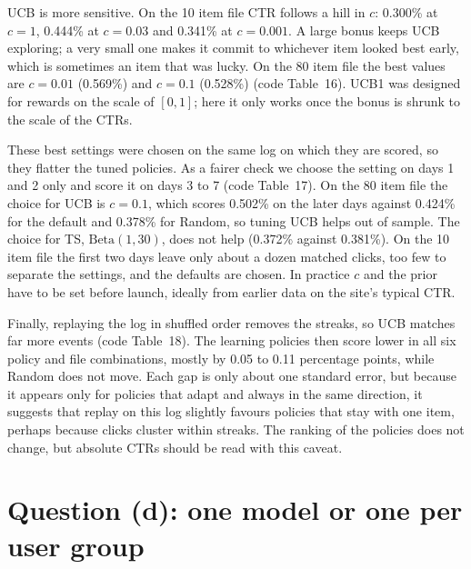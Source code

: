 \documentclass[11pt]{article}
\begin{document}
UCB is more sensitive. On the 10 item file CTR follows a hill in $c$: 0.300\%
at $c=1$, 0.444\% at $c=0.03$ and 0.341\% at $c=0.001$. A large bonus keeps
UCB exploring; a very small one makes it commit to whichever item looked best
early, which is sometimes an item that was lucky. On the 80 item file the best
values are $c=0.01$ (0.569\%) and $c=0.1$ (0.528\%) (code Table~16). UCB1
was designed for rewards on the scale of $[0,1]$; here it only works once the
bonus is shrunk to the scale of the CTRs.

These best settings were chosen on the same log on which they are scored, so
they flatter the tuned policies. As a fairer check we choose the setting on
days 1 and 2 only and score it on days 3 to 7 (code Table~17). On the 80 item
file the choice for UCB is $c=0.1$, which scores 0.502\% on the later days
against 0.424\% for the default and 0.378\% for Random, so tuning UCB helps out
of sample. The choice for TS, $\text{Beta}(1,30)$, does not help (0.372\%
against 0.381\%). On the 10 item file the first two days leave only about a dozen
matched clicks, too few to separate the settings, and the defaults are chosen. In
practice $c$ and the prior have to be set before launch, ideally from earlier
data on the site's typical CTR.

Finally, replaying the log in shuffled order removes the streaks, so UCB
matches far more events (code Table~18). The learning policies then score
lower in all six policy and file combinations, mostly by 0.05 to 0.11
percentage points, while Random does not move. Each gap is only about one
standard error, but because it appears only for policies that adapt and
always in the same direction, it suggests that replay on this log slightly
favours policies that stay with one item, perhaps because clicks cluster
within streaks. The ranking of the policies does not change, but absolute
CTRs should be read with this caveat.

\section{Question (d): one model or one per user group}
\label{sec:d}
\end{document}
